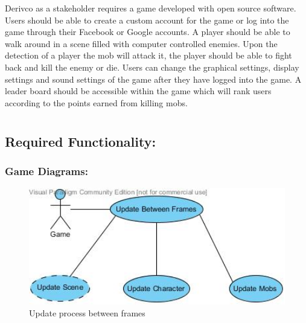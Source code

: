 \documentclass[letterpaper]{article}
\begin{document}
			Derivco as a stakeholder requires a game developed with open source software. Users should be able to create a custom account for the game or log into the game through their Facebook or Google accounts. A player should be able to walk around in a scene filled with computer controlled enemies. Upon the detection of a player the mob will attack it, the player should be able to fight back and kill the enemy or die. Users can change the graphical settings, display settings and sound settings of the game after they have logged into the game. A leader board should be accessible within the game which will rank users according to the points earned from killing mobs.
			
		\section*{\colorbox{blue}{}} 
		\vspace{0.1in}
		
			\subsection*{Required Functionality:}
			\vspace{0.1in}
			
				\subsubsection*{Game Diagrams:}
				\vspace{0.2in}
				
					\begin{figure}[H]
					\centering
					\includegraphics[width=140mm]{UML_Diagram/Use_Case/Game_Process.jpg}
					\caption{Update process between frames}
					\end{figure}
					
\end{document}
